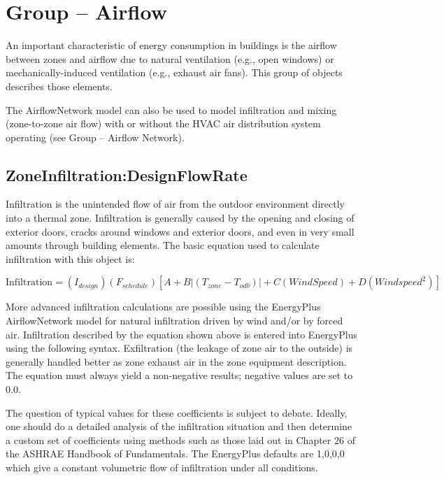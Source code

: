 \section{Group -- Airflow}\label{group-airflow}

An important characteristic of energy consumption in buildings is the airflow between zones and airflow due to natural ventilation (e.g., open windows) or mechanically-induced ventilation (e.g., exhaust air fans). This group of objects describes those elements.

The AirflowNetwork model can also be used to model infiltration and mixing (zone-to-zone air flow) with or without the HVAC air distribution system operating (see Group -- Airflow Network).

\subsection{ZoneInfiltration:DesignFlowRate}\label{zoneinfiltrationdesignflowrate}

Infiltration is the unintended flow of air from the outdoor environment directly into a thermal zone. Infiltration is generally caused by the opening and closing of exterior doors, cracks around windows and exterior doors, and even in very small amounts through building elements. The basic equation used to calculate infiltration with this object is:

\begin{equation}
  \mathrm{Infiltration} = \left( {{I_{design}}} \right)\left( {{F_{schedule}}} \right)\left[ {A + B\left| {\left( {{T_{zone}} - {T_{odb}}} \right)} \right| + C\left( {WindSpeed} \right) + D\left( {Windspee{d^2}} \right)} \right]
\end{equation}

More advanced infiltration calculations are possible using the EnergyPlus AirflowNetwork model for natural infiltration driven by wind and/or by forced air. Infiltration described by the equation shown above is entered into EnergyPlus using the following syntax. Exfiltration (the leakage of zone air to the outside) is generally handled better as zone exhaust air in the zone equipment description. The equation must always yield a non-negative results; negative values are set to 0.0.

The question of typical values for these coefficients is subject to debate. Ideally, one should do a detailed analysis of the infiltration situation and then determine a custom set of coefficients using methods such as those laid out in Chapter 26 of the ASHRAE Handbook of Fundamentals. The EnergyPlus defaults are 1,0,0,0 which give a constant volumetric flow of infiltration under all conditions.

